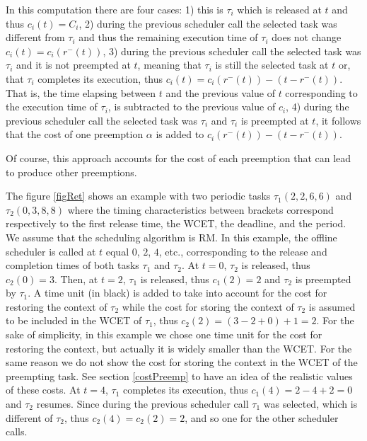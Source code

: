 \documentclass[conference,compsocconf]{IEEEtran}
\begin{document}
In this computation there are four cases: 1) this is $\tau_i$ which is released
at $t$ and thus $c_i(t)=C_i$, 2) during the previous scheduler call the
selected task was different from $\tau_i$ and thus the remaining execution time
of $\tau_i$ does not change $c_i(t)=c_i(r^{-}(t))$, 3) during the previous
scheduler call the selected task was $\tau_i$ and it is not preempted at $t$,
meaning that $\tau_i$ is still the selected task at $t$ or, that $\tau_i$
completes its execution, thus $c_i(t)=c_i(r^{-}(t))-(t-r^{-}(t))$. That is, the
time elapsing between $t$ and the previous value of $t$ corresponding to the
execution time of $\tau_i$, is subtracted to the previous value of $c_i$, 4)
during the previous scheduler call the selected task was $\tau_i$ and $\tau_i$
is preempted at $t$, it follows that the cost of one preemption $\alpha$ is
added to $c_i(r^{-}(t))-(t-r^{-}(t))$.

Of course, this approach accounts for the cost of each preemption that can lead
to produce other preemptions.

The figure \ref{figRet} shows an example with two periodic tasks
$\tau_1(2,2,6,6)$ and $\tau_2(0,3,8,8)$ where the timing characteristics
between brackets correspond respectively to the first release time, the WCET,
the deadline, and the period. We assume that the scheduling algorithm is RM. In
this example, the offline scheduler is called at $t$ equal $0$, $2$, $4$, etc.,
corresponding to the release and completion times of both tasks $\tau_1$ and
$\tau_2$. At $t=0$, $\tau_2$ is released, thus $c_2(0)=3$. Then, at $t=2$,
$\tau_1$ is released, thus $c_1(2)=2$ and $\tau_2$ is preempted by $\tau_1$. A
time unit (in black) is added to take into account for the cost for restoring
the context of $\tau_2$ while the cost for storing the context of $\tau_2$ is
assumed to be included in the WCET of $\tau_1$, thus $c_2(2)=(3-2+0)+1=2$. For
the sake of simplicity, in this example we chose one time unit for the cost for
restoring the context, but actually it is widely smaller than the WCET. For the
same reason we do not show the cost for storing the context in the WCET of the
preempting task. See section \ref{costPreemp} to have an idea of the realistic
values of these costs.  At $t=4$, $\tau_1$ completes its execution, thus
$c_1(4)=2-4+2=0$ and $\tau_2$ resumes. Since during the previous scheduler call
$\tau_1$ was selected, which is different of $\tau_2$, thus $c_2(4)=c_2(2)=2$,
and so one for the other scheduler calls.

\end{document}

